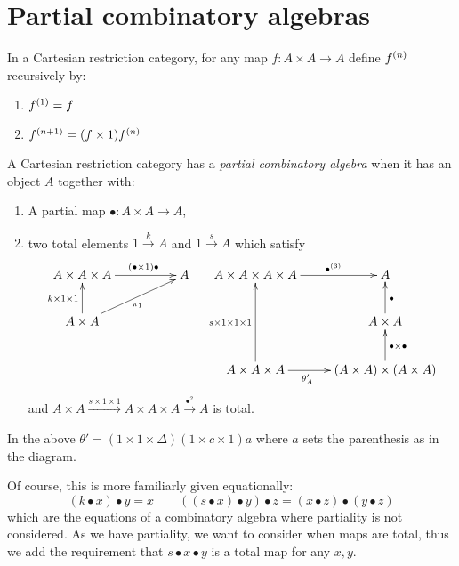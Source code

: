 \section{Partial combinatory algebras}
\label{sec:partial_combinatory_algebras}

\begin{notation}\label{not:multi-self-map}
  In a Cartesian restriction category, for any map $f:A\times A\to A$ define ${f}^{(n)}$
  recursively by:
  \begin{enumerate}[{(}i{)}]
  \item ${f}^{(1)} = f$
  \item ${f}^{(n+1)} = (f\times 1) {f}^{(n)}$
  \end{enumerate}
\end{notation}
\begin{definition}\label{def:partial_combinatory_algebra}
  A Cartesian restriction category has a \emph{partial combinatory algebra} when it has an object
  $A$ together with:
  \begin{enumerate}[{(}i{)}]
  \item A partial map $\bullet:A\times A \to A$,
  \item two total elements $1\xrightarrow{k}A$ and $1\xrightarrow{s}{A}$ which satisfy
    \[
      \xymatrix@C+25pt{
        A\times A\times A \ar[r]^(.6){(\bullet\times 1)\bullet} & A\\
        A\times A \ar[u]^{k\times1\times1} \ar[ur]_{\pi_1}
      }\quad
      \xymatrix{
        A\times A\times A\times A \ar[r]^(.6){\multibullet{3}}&A\\
        &A\times A \ar[u]_{\bullet}\\
        A\times A\times A \ar[uu]^{s\times1\times1\times1} \ar[r]_(.4){\theta_A'}
          & (A\times A) \times (A\times A) \ar[u]_{\bullet\times\bullet}
      }
    \]
    and $A\times A \xrightarrow{s\times1\times1} A\times A\times A \xrightarrow{\bullet^2} A$ is total.
  \end{enumerate}
  In the above $\theta' = (1\times1\times\Delta)(1\times c \times 1)a$ where $a$ sets the
  parenthesis as in the diagram.
\end{definition}

Of course, this is more familiarly given equationally:
\[
   (k\bullet x)\bullet y = x \qquad ((s\bullet x)\bullet y) \bullet z = (x\bullet z) \bullet
   (y\bullet z)
\]
which are the equations of a combinatory algebra where partiality is not considered. As we have
partiality, we want to consider when maps are total, thus we add the requirement that
$s\bullet x\bullet y$ is a
total map for any $x,y$.

